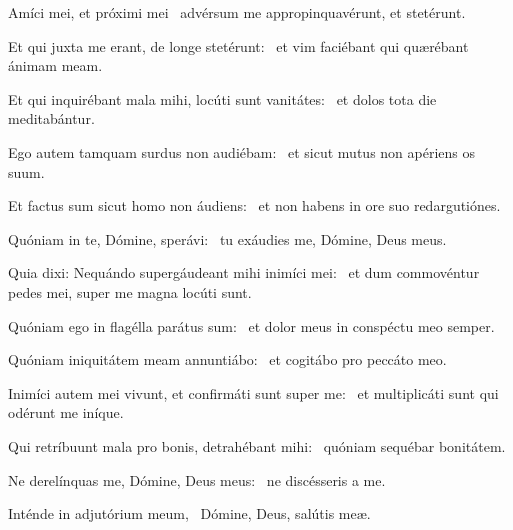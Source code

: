
\item Amíci mei, et próximi mei~\psstar{} advérsum me appropinquavérunt, et stetérunt.

\item Et qui juxta me erant, de longe stetérunt:~\psstar{} et vim faciébant qui quærébant ánimam meam.

\item Et qui inquirébant mala mihi, locúti sunt vanitátes:~\psstar{} et dolos tota die meditabántur.

\item Ego autem tamquam surdus non audiébam:~\psstar{} et sicut mutus non apériens os suum.

\item Et factus sum sicut homo non áudiens:~\psstar{} et non habens in ore suo redargutiónes.

\item Quóniam in te, Dómine, sperávi:~\psstar{} tu exáudies me, Dómine, Deus meus.

\item Quia dixi: Nequándo supergáudeant mihi inimíci mei:~\psstar{} et dum commovéntur pedes mei, super me magna locúti sunt.

\item Quóniam ego in flagélla parátus sum:~\psstar{} et dolor meus in conspéctu meo semper.

\item Quóniam iniquitátem meam annuntiábo:~\psstar{} et cogitábo pro peccáto meo.

\item Inimíci autem mei vivunt, et confirmáti sunt super me:~\psstar{} et multiplicáti sunt qui odérunt me iníque.

\item Qui retríbuunt mala pro bonis, detrahébant mihi:~\psstar{} quóniam sequébar bonitátem.

\item Ne derelínquas me, Dómine, Deus meus:~\psstar{} ne discésseris a me.

\item Inténde in adjutórium meum,~\psstar{} Dómine, Deus, salútis meæ.